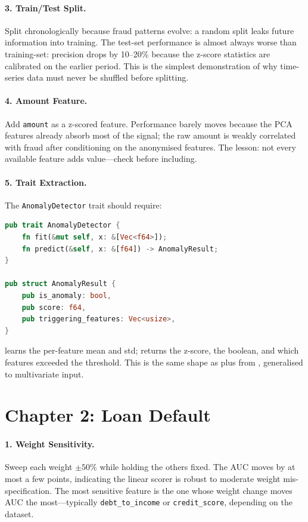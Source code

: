 \paragraph{3. Train/Test Split.}
Split chronologically because fraud patterns evolve: a random split
leaks future information into training. The test-set performance is
almost always worse than training-set: precision drops by 10--20\%
because the z-score statistics are calibrated on the earlier period.
This is the simplest demonstration of why time-series data must
never be shuffled before splitting.

\paragraph{4. Amount Feature.}
Add \texttt{amount} as a z-scored feature. Performance barely moves
because the PCA features already absorb most of the signal; the
raw amount is weakly correlated with fraud after conditioning on the
anonymised features. The lesson: not every available feature adds
value---check before including.

\paragraph{5. Trait Extraction.}
The \texttt{AnomalyDetector} trait should require:
\begin{lstlisting}[language=Rust]
pub trait AnomalyDetector {
    fn fit(&mut self, x: &[Vec<f64>]);
    fn predict(&self, x: &[f64]) -> AnomalyResult;
}

pub struct AnomalyResult {
    pub is_anomaly: bool,
    pub score: f64,
    pub triggering_features: Vec<usize>,
}
\end{lstlisting}
 learns the per-feature mean and std; 
returns the z-score, the boolean, and which features exceeded the
threshold. This is the same shape as  plus
 from , generalised to multivariate
input.

\section*{Chapter 2: Loan Default}

\paragraph{1. Weight Sensitivity.}
Sweep each weight $\pm 50\%$ while holding the others fixed. The AUC
moves by at most a few points, indicating the linear scorer is
robust to moderate weight mis-specification. The most sensitive
feature is the one whose weight change moves AUC the most---typically
\texttt{debt\_to\_income} or \texttt{credit\_score}, depending on the
dataset.

